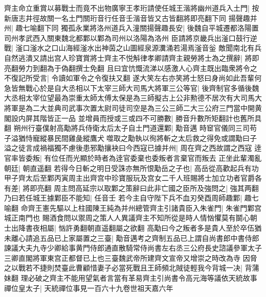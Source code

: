 齊主命立重賞以募戰士而竟不出物廣寧王孝珩請使任城王湝將幽州道兵入土門|{
	按新唐志井徑故關一名土門關珩音行任音壬湝音皆又古皆翻將即亮翻下同}
揚聲趣并州|{
	趣七喻翻下同}
獨孤永業將洛州道兵入潼關揚聲趣長安|{
	後魏自平城遷都洛陽置司州孝武西入關東魏北都鄴以鄴為司州以洛陽為洛州}
臣請將京畿兵出滏口鼓行逆戰|{
	滏口滏水之口山海經滏水出神茵之山圖經泉源瀵涌若湯焉滏音釡}
敵聞南北有兵自然逃潰又請出宫人珍寶賞將士齊主不悦斛律孝卿請齊主親勞將士為之撰辭|{
	將即亮翻勞力到翻為于偽翻撰士免翻}
且曰宜忼慨流涕以感激人心齊主既出臨衆將令之不復記所受言|{
	令讀如軍令之令復扶又翻}
遂大笑左右亦笑將士怒曰身尚如此吾輩何急皆無戰心於是自大丞相以下太宰三師大司馬大將軍三公等官|{
	後齊制官多循後魏大丞相太宰位望最為崇重太師太傅太保是為三師擬古上公非勲德不居次有大司馬大將軍是為二大並典司武事次置太尉司徒司空是為三公三師二大三公府三門當中開黄閣設内屏其階皆正一品}
並增員而授或三或四不可勝數|{
	勝音升數所矩翻計也舊所具翻}
朔州行臺僕射高勱將兵侍衛太后太子自土門道還鄴|{
	勱音邁}
時䆠官儀同三司苟子溢猶恃寵縱暴民間雞彘縱鷹犬噬取之勱執以徇將斬之太后救之得免或謂勱曰子溢之徒言成禍福獨不慮後患邪勱攘袂曰今西寇已據并州|{
	周在齊之西故謂之西寇}
逹官率皆委叛|{
	有位任而光顯於時者為逹官委棄也委叛者言棄官而叛去}
正坐此輩濁亂朝廷|{
	朝直遥翻}
若得今日斬之明日受誅亦無所恨勱岳之子也|{
	高岳從高歡起兵有功}
甲子齊太后至鄴丙寅周主出齊宫中珍寶服玩及宫女二千人班賜將士加立功者官爵各有差|{
	將即亮翻}
周主問高延宗以取鄴之策辭曰此非亡國之臣所及強問之|{
	強其两翻}
乃曰若任城王據鄴臣不能知|{
	任音壬}
若今主自守陛下兵不血刃癸酉周師趣鄴|{
	趣七喻翻}
命齊王憲先驅以上柱國陳王純為并州總管齊主引諸貴臣入朱雀門|{
	朱雀門鄴宫城正南門也}
賜酒食問以禦周之策人人異議齊主不知所從是時人情忷懼莫有鬬心朝士出降書夜相屬|{
	忷許勇翻朝直遥翻屬之欲翻}
高勱曰今之叛者多是貴人至於卒伍猶未離心請追五品已上家屬置之三臺|{
	勱音邁考之齊制五品已上謂自尚書郎中書侍郎諫議大夫九寺少卿給事黄門侍郎通直散騎常侍尚書左右丞三公府長史諮議參軍太子三卿直閣將軍東宫正都督已上也三臺魏武帝所建齊文宣帝又增崇之時改為寺}
因脅之以戰若不捷則焚臺此曹顧惜妻子必當死戰且王師頻北賊徒輕我今背城一决|{
	背蒲妹翻}
理必破之齊主不能用望氣者言當有革易齊主引尚書令高元海等議依天統故事禪位皇太子|{
	天統禪位事見一百六十九卷世祖天嘉六年}


